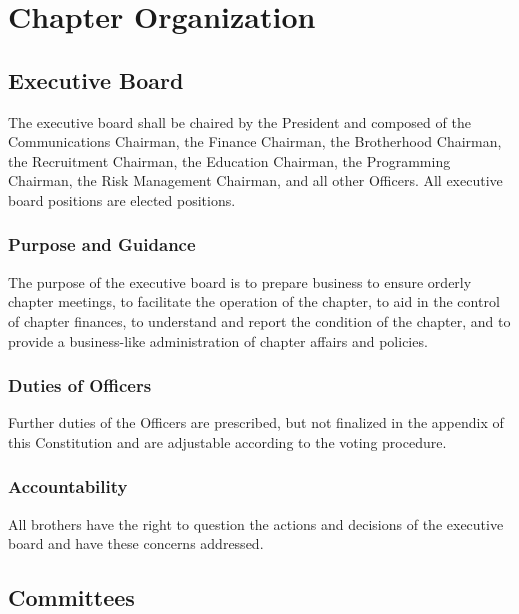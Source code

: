 \chapter{Chapter Organization}
\label{cha:chapter-organization}

\section{Executive Board}
\label{sec:executive-board}

The executive board shall be chaired by the President and composed of the
Communications Chairman, the Finance Chairman, the Brotherhood Chairman, the
Recruitment Chairman, the Education Chairman, the Programming Chairman, the Risk
Management Chairman, and all other Officers.
All executive board positions are elected positions.

\subsection{Purpose and Guidance}
\label{sec:purpose-and-guidelines}

The purpose of the executive board is to prepare business to ensure orderly
chapter meetings, to facilitate the operation of the chapter, to aid in the
control of chapter finances, to understand and report the condition of the
chapter, and to provide a business-like administration of chapter affairs and
policies.

\subsection{Duties of Officers}
\label{sec:duties-of-officers}

Further duties of the Officers are prescribed, but not finalized in the appendix
of this Constitution and are adjustable according to the voting procedure.

\subsection{Accountability}
\label{sec:accountability}

All brothers have the right to question the actions and decisions of the
executive board and have these concerns addressed.

\section{Committees}
\label{sec:committees}

